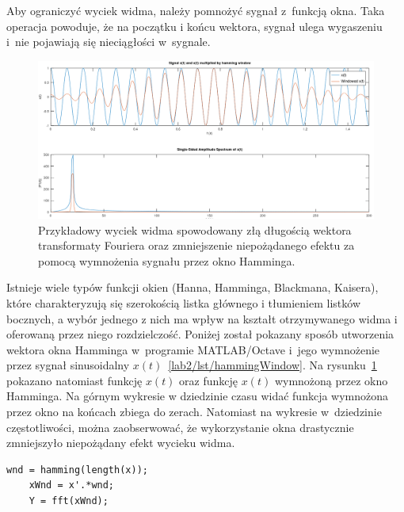 Aby ograniczyć wyciek widma, należy pomnożyć sygnał z~funkcją okna. Taka operacja powoduje, że na początku i końcu wektora, sygnał ulega wygaszeniu i~nie pojawiają się nieciągłości w~sygnale. 
\begin{figure}[hbt!]
	\centering
	\includegraphics[width=0.9\linewidth]{images/spectralLeakage.png}
	\caption{Przykładowy wyciek widma spowodowany złą długością wektora transformaty Fouriera oraz zmniejszenie niepożądanego efektu za pomocą wymnożenia sygnału przez okno Hamminga.}
	\label{lab2/fig/spectralLeakage}
\end{figure}
Istnieje wiele typów funkcji okien (Hanna, Hamminga, Blackmana, Kaisera), które charakteryzują się szerokością listka głównego i tłumieniem listków bocznych, a wybór jednego z nich ma wpływ na kształt otrzymywanego widma i oferowaną przez niego rozdzielczość. Poniżej został pokazany sposób utworzenia wektora okna Hamminga w~programie MATLAB/Octave i~jego wymnożenie przez sygnał sinusoidalny $x(t)$~\ref{lab2/lst/hammingWindow}. Na rysunku~\ref{lab2/fig/spectralLeakage} pokazano natomiast funkcję $x(t)$ oraz funkcję $x(t)$ wymnożoną przez okno Hamminga. Na górnym wykresie w dziedzinie czasu widać funkcja wymnożona przez okno na końcach zbiega do zerach. Natomiast na wykresie w~dziedzinie częstotliwości,  można zaobserwować, że wykorzystanie okna drastycznie zmniejszyło niepożądany efekt wycieku widma.    
\begin{lstlisting}[caption=Wymnożenie sygnału $x(t)$ przez okno Hamminga , label=lab2/lst/hammingWindow]
	wnd = hamming(length(x));
	xWnd = x'.*wnd;
	Y = fft(xWnd);
\end{lstlisting}


